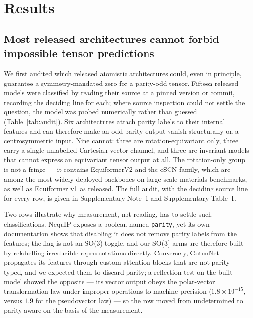 \section*{Results}

\subsection*{Most released architectures cannot forbid impossible tensor predictions}

We first audited which released atomistic architectures could, even in principle, guarantee a symmetry-mandated zero for a parity-odd tensor. Fifteen released models were classified by reading their source at a pinned version or commit, recording the deciding line for each; where source inspection could not settle the question, the model was probed numerically rather than guessed (Table~\ref{tab:audit}). Six architectures attach parity labels to their internal features and can therefore make an odd-parity output vanish structurally on a centrosymmetric input. Nine cannot: three are rotation-equivariant only, three carry a single unlabelled Cartesian vector channel, and three are invariant models that cannot express an equivariant tensor output at all. The rotation-only group is not a fringe --- it contains EquiformerV2 and the eSCN family, which are among the most widely deployed backbones on large-scale materials benchmarks, as well as Equiformer v1 as released. The full audit, with the deciding source line for every row, is given in Supplementary Note~1 and Supplementary Table~1.

Two rows illustrate why measurement, not reading, has to settle such classifications. NequIP exposes a boolean named \texttt{parity}, yet its own documentation shows that disabling it does not remove parity labels from the features; the flag is not an SO(3) toggle, and our SO(3) arms are therefore built by relabelling irreducible representations directly. Conversely, GotenNet propagates its features through custom attention blocks that are not parity-typed, and we expected them to discard parity; a reflection test on the built model showed the opposite --- its vector output obeys the polar-vector transformation law under improper operations to machine precision ($1.8\times10^{-15}$, versus $1.9$ for the pseudovector law) --- so the row moved from undetermined to parity-aware on the basis of the measurement.

